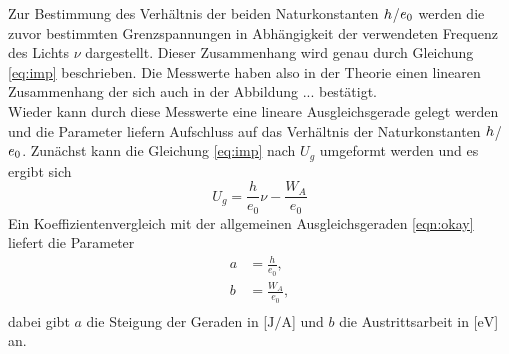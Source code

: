 Zur Bestimmung des Verhältnis der beiden Naturkonstanten $\protect h$/$\protect e_{0}$ werden die zuvor bestimmten Grenzspannungen in Abhängigkeit der verwendeten Frequenz des Lichts $\nu$ dargestellt.
Dieser Zusammenhang wird genau durch Gleichung \eqref{eq:imp} beschrieben. Die Messwerte haben also in der Theorie einen linearen Zusammenhang der sich auch in der Abbildung ... bestätigt.
\\
Wieder kann durch diese Messwerte eine lineare Ausgleichsgerade gelegt werden und die Parameter liefern Aufschluss auf das Verhältnis der Naturkonstanten $\protect h$/$\protect e_{0}$.
Zunächst kann die Gleichung \eqref{eq:imp} nach $U_{g}$ umgeformt werden und es ergibt sich
\begin{equation}
U_{g} = \frac{h}{e_{0}} \nu - \frac{W_A}{e_{0}}
\end{equation}
Ein Koeffizientenvergleich mit der allgemeinen Ausgleichsgeraden \eqref{eqn:okay} liefert die Parameter
\begin{align}
a &= \frac{h}{e_{0}},\\
b &= \frac{W_A}{e_{0}},\\
\end{align}
dabei gibt $a$ die Steigung der Geraden in [$\si{\joule\per\ampere}$] und $b$ die Austrittsarbeit in [$\si{\electronvolt}$] an.